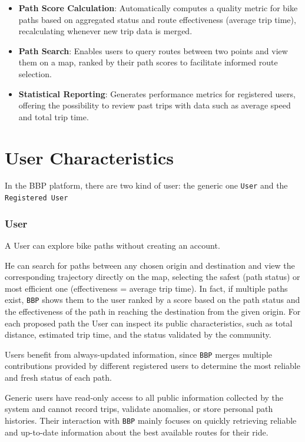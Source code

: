 \begin{itemize}
    \item \textbf{Path Score Calculation}: Automatically computes a quality metric for bike paths based on aggregated status and route effectiveness (average trip time), recalculating whenever new trip data is merged.

    \item \textbf{Path Search}: Enables users to query routes between two points and view them on a map, ranked by their path scores to facilitate informed route selection.

    \item \textbf{Statistical Reporting}: Generates performance metrics for registered users, offering the possibility to review past trips with data such as average speed and total trip time.
\end{itemize}

\section{User Characteristics}
\label{sec:users}

In the BBP platform, there are two kind of user: the generic one \texttt{User} and the \texttt{Registered User}

\subsubsection{ User}

A User can explore bike paths without creating an account.

He can search for paths between any chosen origin and destination and view the corresponding trajectory directly on the map, selecting the safest (path status) or most efficient one (effectiveness = average trip time). In fact, if multiple paths exist, \texttt{BBP} shows them to the user ranked by a score based on the path status and the effectiveness of the path in reaching the destination from the given origin. For each proposed path the User can inspect its public characteristics, such as total distance, estimated trip time, and the status validated by the community.

Users benefit from always-updated information, since \texttt{BBP} merges multiple contributions provided by different registered users to determine the most reliable and fresh status of each path.

Generic users have read-only access to all public information collected by the system and cannot record trips, validate anomalies, or store personal path histories. Their interaction with \texttt{BBP} mainly focuses on quickly retrieving reliable and up-to-date information about the best available routes for their ride.

